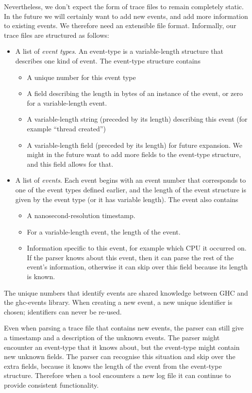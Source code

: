 \documentclass[twocolumn,9pt]{sigplanconf}
\newcommand{\codef}[1]{{\fontfamily{cmss}\small#1}}
\begin{document}
Nevertheless, we don't expect the form of trace files to remain
completely static.  In the future we will certainly want to add new
events, and add more information to existing events.  We therefore
need an extensible file format.  Informally, our trace files are
structured as follows:

\begin{itemize}
\item A list of \emph{event types}.  An event-type is a
  variable-length structure that describes one kind of event.  The
  event-type structure contains
  \begin{itemize}
    \item A unique number for this event type
    \item A field describing the length in bytes of an instance of the
      event, or zero for a variable-length event.
    \item A variable-length string (preceded by its length) describing
      this event (for example ``thread created'')
    \item A variable-length field (preceded by its length) for future
      expansion.  We might in the future want to add more fields to
      the event-type structure, and this field allows for that.
  \end{itemize}
\item A list of \emph{events}.  Each event begins with an event number
  that corresponds to one of the event types defined earlier, and the
  length of the event structure is given by the event type (or it has
  variable length).  The event also contains
  \begin{itemize}
  \item A nanosecond-resolution timestamp.
  \item For a variable-length event, the length of the event.
  \item Information specific to this event, for example which CPU it
    occurred on.  If the parser knows about this event, then it can
    parse the rest of the event's information, otherwise it can skip
    over this field because its length is known.
  \end{itemize}
\end{itemize}

The unique numbers that identify events are shared knowledge between
GHC and the \codef{ghc-events} library.  When creating a new event, a new
unique identifier is chosen; identifiers can never be re-used.

Even when parsing a trace file that contains new events, the parser
can still give a timestamp and a description of the unknown events.
The parser might encounter an event-type that it knows about, but the
event-type might contain new unknown fields.  The parser can recognise
this situation and skip over the extra fields, because it knows the
length of the event from the event-type structure.  Therefore when a
tool encounters a new log file it can continue to provide consistent
functionality.
\end{document}
